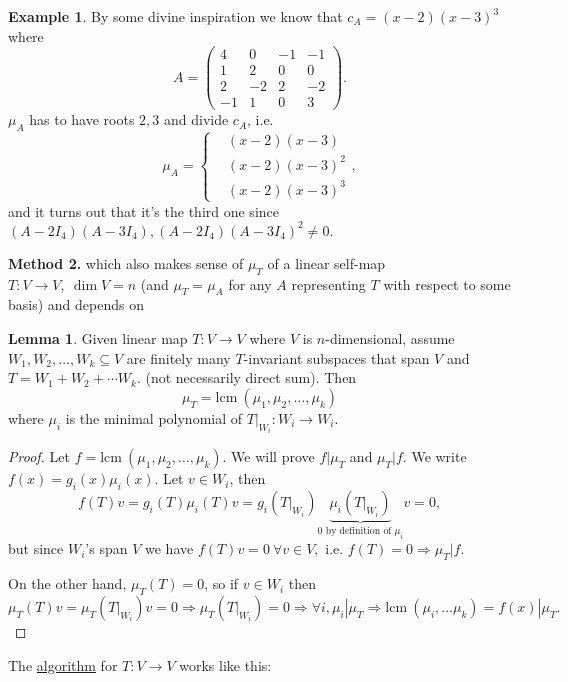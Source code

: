 \documentclass[a4paper]{article}
\newcommand{\lcm}{\text{lcm}\ }
\theoremstyle{definition}
\newtheorem{lemma}[defn]{Lemma}
\newtheorem{example}[defn]{Example}
\begin{document}
\begin{example}
	By some divine inspiration we know that $c_{A}=(x-2)(x-3)^3$ where
\[
A=\begin{pmatrix}
		4 & 0 & -1 & -1 \\ 1 & 2 & 0 & 0 \\ 2 & -2 & 2 & -2 \\ -1 & 1 & 0 & 3
	\end{pmatrix} .
\]
$\mu_{A}$ has to have roots $2,3$ and divide $c_{A}$, i.e.
\[
\mu_{A}=\left\{ \begin{aligned}
		&(x-2)(x-3) \\ &(x-2)(x-3)^2 \\ &(x-2)(x-3)^3
	\end{aligned} \right. ,
\]
and it turns out that it's the third one since $(A-2I_4)(A-3I_4),(A-2I_4)(A-3I_4)^2 \neq 0 .$
\end{example}

\textbf{Method 2.} which also makes sense of $\mu_T$ of a linear self-map $T:V\rightarrow V, \ \dim V=n$ (and $\mu_T=\mu_{A}$ for any $A$ representing $T$ with respect to some basis) and depends on
\begin{lemma}
	Given linear map $T:V\rightarrow V$ where $V$ is $n$-dimensional, assume $W_1,W_2,\ldots,W_k \subseteq V$ are finitely many $T$-invariant subspaces that span $V$ and $T=W_1+W_2+\cdots W_k .$ (not necessarily direct sum). Then
\[
\mu_T=\lcm (\mu_1,\mu_2,\ldots,\mu_k)
\]
where $\mu_i$ is the minimal polynomial of $\left. T \right|_{W_i}: W_i \rightarrow W_i$.
\end{lemma}

\begin{proof}
	Let $f=\lcm (\mu_1,\mu_2,\ldots,\mu_k)$. We will prove $f|\mu_T$ and $\mu_T|f$. We write $f(x)=g_i(x)\mu_i(x)$. Let $v\in W_i$, then
\[
f(T)v=g_i(T)\mu_i(T)v=g_i\left(\left. T\right|_{W_i}\right)\underbrace{\mu_i \left(\left. T\right|_{W_i}\right)}_{0\text{ by definition of }\mu_i}v=0 ,
\]
but since $W_i$'s span $V$ we have $f(T)v=0 \ \forall v\in V ,$ i.e. $f(T)=0 \Rightarrow \mu_T |f$.

	On the other hand, $\mu_T(T)=0$, so if $v\in W_i$ then $\mu_T(T)v=\mu_T\left(\left.T\right|_{W_i}\right)v=0 \Rightarrow \mu_T\left(\left.T\right|_{W_i}\right)=0 \Rightarrow \forall i, \mu_i |\mu_T \Rightarrow \lcm (\mu_i,\ldots \mu_k)=f(x)|\mu_T .$
\end{proof}

The \underline{algorithm} for $T:V\rightarrow V$ works like this:
\end{document}
